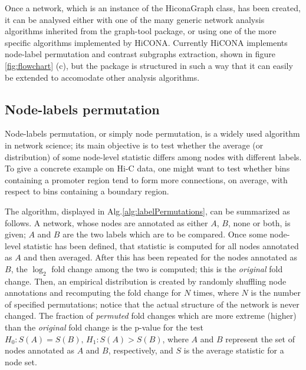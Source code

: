 Once a network, which is an instance of the HiconaGraph class, has been created, it can be analysed either with one of the many generic network analysis algorithms inherited from the graph-tool package, or using one of the more specific algorithms implemented by HiCONA. Currently HiCONA implements node-label permutation and contrast subgraphs extraction, shown in figure \ref{fig:flowchart} (c), but the package is structured in such a way that it can easily be extended to accomodate other analysis algorithms.

\subsection{Node-labels permutation}

Node-labels permutation, or simply node permutation, is a widely used algorithm in network science; its main objective is to test whether the average (or distribution) of some node-level statistic differs among nodes with different labels. To give a concrete example on Hi-C data, one might want to test whether bins containing a promoter region tend to form more connections, on average, with respect to bins containing a boundary region. 

The algorithm, displayed in Alg.\ref{alg:labelPermutations}, can be summarized as follows. A network, whose nodes are annotated as either $A$, $B$, none or both, is given; $A$ and $B$ are the two labels which are to be compared. Once some node-level statistic has been defined, that statistic is computed for all nodes annotated as $A$ and then averaged. After this has been repeated for the nodes annotated as $B$, the $\log_2$ fold change among the two is computed; this is the \emph{original} fold change. Then, an empirical distribution is created by randomly shuffling node annotations and recomputing the fold change for $N$ times, where $N$ is the number of specified permutations; notice that the actual structure of the network is never changed. The fraction of \emph{permuted} fold changes which are more extreme (higher) than the \emph{original} fold change is the p-value for the test $H_0: S(A) = S(B), \, H_1: S(A) > S(B)$, where $A$ and $B$ represent the set of nodes annotated as $A$ and $B$, respectively, and $S$ is the average statistic for a node set. 

